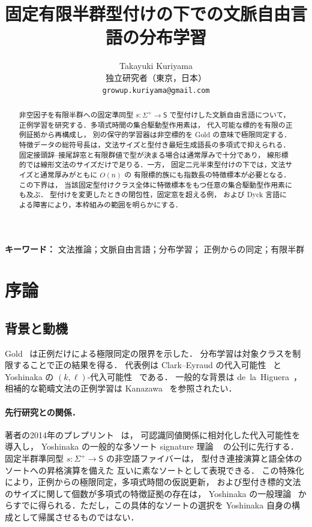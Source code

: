\documentclass[11pt,a4paper]{ltjsarticle}
\title{固定有限半群型付けの下での文脈自由言語の分布学習}
\author{Takayuki Kuriyama\\
独立研究者（東京，日本）\\
\texttt{growup.kuriyama@gmail.com}}
\date{}
\theoremstyle{remark}
\theoremstyle{plain}
\begin{document}
\linenumbers
\maketitle

\begin{abstract}
非空因子を有限半群への固定準同型
$s:\Sigma^+\to\mathsf S$ で型付けした文脈自由言語について，
正例学習を研究する．多項式時間の集合駆動型作用素は，
代入可能な標的を有限の正例証拠から再構成し，
別の保守的学習器は非空標的を Gold の意味で極限同定する．
特徴データの総符号長は，文法サイズと型付き最短生成語長の多項式で抑えられる．
固定接頭辞--接尾辞窓と有限群値で型が決まる場合は通常厚みで十分であり，
線形標的では線形文法のサイズだけで足りる．一方，
固定二元半束型付けの下では，文法サイズと通常厚みがともに $O(n)$ の
有限標的族にも指数長の特徴標本が必要となる．この下界は，
当該固定型付けクラス全体に特徴標本をもつ任意の集合駆動型作用素にも及ぶ．
型付けを変更したときの閉包性，固定窓を超える例，
および Dyck 言語による障害により，本枠組みの範囲を明らかにする．
\end{abstract}

\noindent\textbf{キーワード：} 文法推論；文脈自由言語；分布学習；
正例からの同定；有限半群
\par\medskip

\section{序論}

\subsection{背景と動機}

Gold~\cite{gold1967} は正例だけによる極限同定の限界を示した．
分布学習は対象クラスを制限することで正の結果を得る．
代表例は Clark--Eyraud の代入可能性~\cite{clark-eyraud2007} と
Yoshinaka の $(k,\ell)$-代入可能性~\cite{yoshinaka2008} である．
一般的な背景は de~la~Higuera~\cite{higuera2010}，
相補的な範疇文法の正例学習は
Kanazawa~\cite{kanazawa1996,kanazawa1998} を参照されたい．

\paragraph{先行研究との関係．}
著者の2014年のプレプリント~\cite{kuriyama2014} は，
可認識同値関係に相対化した代入可能性を導入し，
Yoshinaka の一般的な多ソート signature 理論
~\cite{yoshinaka2015} の公刊に先行する．
固定半群準同型 $s:\Sigma^+\to\mathsf S$ の非空語ファイバーは，
型付き連接演算と語全体のソートへの昇格演算を備えた
互いに素なソートとして表現できる．
この特殊化により，正例からの極限同定，多項式時間の仮説更新，
および型付き標的文法のサイズに関して個数が多項式の特徴証拠の存在は，
Yoshinaka の一般理論~\cite[Theorem~1 and Lemma~3]{yoshinaka2015}
からすでに得られる．ただし，この具体的なソートの選択を
Yoshinaka 自身の構成として帰属させるものではない．
\end{document}
